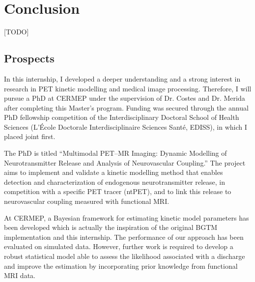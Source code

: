 \chapter{Conclusion}
 [TODO]

\section*{Prospects}
In this internship, I developed a deeper understanding and a strong interest in research in PET kinetic modelling and medical image processing.
Therefore, I will pursue a PhD at CERMEP under the supervision of Dr. Costes and Dr. Merida after completing this Master's program.
Funding was secured through the annual PhD fellowship competition of the Interdisciplinary Doctoral School of Health Sciences (L'École Doctorale Interdisciplinaire Sciences Santé, EDISS), in which I placed joint first.

The PhD is titled “Multimodal PET–MR Imaging: Dynamic Modelling of Neurotransmitter Release and Analysis of Neurovascular Coupling.”
The project aims to implement and validate a kinetic modelling method that enables detection and characterization of endogenous neurotransmitter release, in competition with a specific PET tracer (ntPET), and to link this release to neurovascular coupling measured with functional MRI.

At CERMEP, a Bayesian framework for estimating kinetic model parameters has been developed \cite{irace2020bayesian} which is actually the inspiration of the original BGTM implementation and this internship.
The performance of our approach has been evaluated on simulated data.
However, further work is required to develop a robust statistical model able to assess the likelihood associated with a discharge and improve the estimation by incorporating prior knowledge from functional MRI data.
